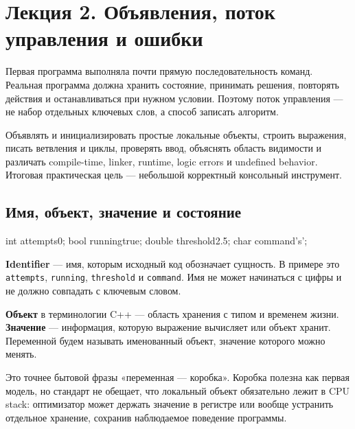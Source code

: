 
\section{Лекция 2. Объявления, поток управления и ошибки}
\label{sec:lecture-02}

Первая программа выполняла почти прямую последовательность команд. Реальная
программа должна хранить состояние, принимать решения, повторять действия и
останавливаться при нужном условии. Поэтому поток управления --- не набор
отдельных ключевых слов, а способ записать алгоритм.

\begin{importantbox}
Объявлять и инициализировать простые локальные объекты, строить выражения,
писать ветвления и циклы, проверять ввод, объяснять область видимости и
различать compile-time, linker, runtime, logic errors и undefined behavior.
Итоговая практическая цель --- небольшой корректный консольный инструмент.
\end{importantbox}

\subsection{Имя, объект, значение и состояние}

\begin{cppcode}
int attempts{0};
bool running{true};
double threshold{2.5};
char command{'s'};
\end{cppcode}

\begin{definition}
\textbf{Identifier} --- имя, которым исходный код обозначает сущность.
В примере это \texttt{attempts}, \texttt{running}, \texttt{threshold} и
\texttt{command}. Имя не может начинаться с цифры и не должно совпадать с
ключевым словом.
\end{definition}

\begin{definition}
\textbf{Объект} в терминологии C++ --- область хранения с типом и временем
жизни. \textbf{Значение} --- информация, которую выражение вычисляет или
объект хранит. Переменной будем называть именованный объект, значение которого
можно менять.
\end{definition}

Это точнее бытовой фразы «переменная --- коробка». Коробка полезна как первая
модель, но стандарт не обещает, что локальный объект обязательно лежит в CPU
stack: оптимизатор может держать значение в регистре или вообще устранить
отдельное хранение, сохранив наблюдаемое поведение программы.

